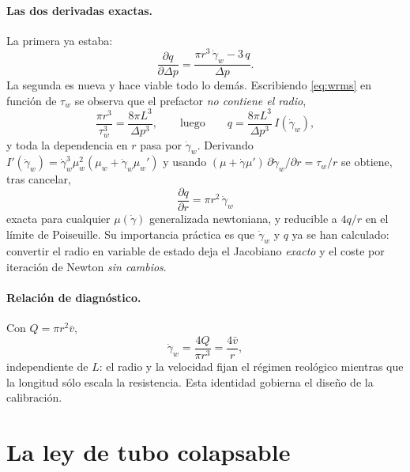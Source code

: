 \documentclass[11pt]{article}
\newcommand{\dd}[2]{\frac{\partial #1}{\partial #2}}
\begin{document}
\paragraph{Las dos derivadas exactas.} La primera ya estaba:
\begin{equation}
  \dd{q}{\Delta p}=\frac{\pi r^3\,\dot\gamma_w-3\,q}{\Delta p} .
  \label{eq:dqdp}
\end{equation}
La segunda es nueva y hace viable todo lo dem\'as. Escribiendo
\eqref{eq:wrms} en funci\'on de $\tau_w$ se observa que el prefactor
\emph{no contiene el radio},
\[
  \frac{\pi r^{3}}{\tau_w^{3}}=\frac{8\pi L^{3}}{\Delta p^{3}},
  \qquad\text{luego}\qquad
  q=\frac{8\pi L^{3}}{\Delta p^{3}}\,I(\dot\gamma_w),
\]
y toda la dependencia en $r$ pasa por $\dot\gamma_w$. Derivando
$I'(\dot\gamma_w)=\dot\gamma_w^{3}\mu_w^{2}(\mu_w+\dot\gamma_w\mu_w')$ y usando
$(\mu+\dot\gamma\mu')\,\partial\dot\gamma_w/\partial r=\tau_w/r$ se obtiene, tras
cancelar,
\begin{equation}
  \boxed{\;\dd{q}{r}=\pi r^{2}\,\dot\gamma_w\;}
  \label{eq:dqdr}
\end{equation}
exacta para cualquier $\mu(\dot\gamma)$ generalizada newtoniana, y reducible a
$4q/r$ en el l\'imite de Poiseuille. Su importancia pr\'actica es que
$\dot\gamma_w$ y $q$ ya se han calculado: convertir el radio en variable de
estado deja el Jacobiano \emph{exacto} y el coste por iteraci\'on de Newton
\emph{sin cambios}.

\paragraph{Relaci\'on de diagn\'ostico.} Con $Q=\pi r^2\bar v$,
\begin{equation}
  \dot\gamma_w=\frac{4Q}{\pi r^3}=\frac{4\bar v}{r},
  \label{eq:shear}
\end{equation}
independiente de $L$: el radio y la velocidad fijan el r\'egimen reol\'ogico
mientras que la longitud s\'olo escala la resistencia. Esta identidad gobierna
el dise\~no de la calibraci\'on.

\section{La ley de tubo colapsable}
\label{sec:tubo}
\end{document}
